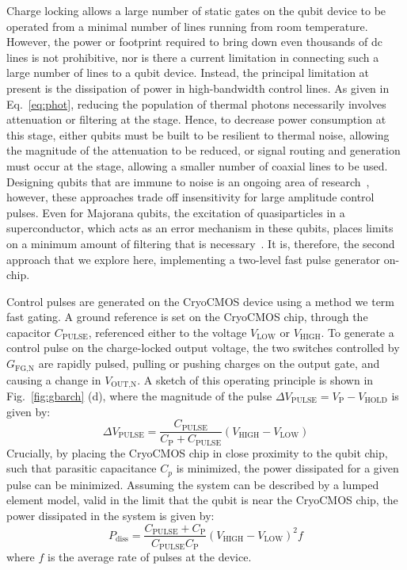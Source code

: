 Charge locking allows a large number of static gates on the qubit device to be operated from a minimal number of lines running from room temperature. However, the power or footprint required to bring down even thousands of dc lines is not prohibitive, nor is there a current limitation in connecting such a large number of lines to a qubit device. Instead, the principal limitation at present is the dissipation of power in high-bandwidth control lines. As given in Eq.~\ref{eq:phot}, reducing the population of thermal photons necessarily involves attenuation or filtering at the \si{\mk} stage. Hence, to decrease power consumption at this stage, either qubits must be built to be resilient to thermal noise, allowing
the magnitude of the attenuation to be reduced, or signal routing and generation must occur at the \si{\mk} stage, allowing a smaller number of coaxial lines to be used. Designing qubits
that are immune to noise is an ongoing area of research~\cite{PhysRevB.93.121410,PhysRevLett.121.177701,PhysRevB.97.155402}, however, these approaches trade off insensitivity for large amplitude control pulses. Even for Majorana qubits, the excitation of quasiparticles in a superconductor, which acts as an error mechanism in these qubits, places limits on a minimum amount of filtering that is necessary~\cite{PhysRevLett.106.167004}. It is, therefore, the second approach that we explore here, implementing a two-level
fast pulse generator on-chip.

Control pulses are generated on the CryoCMOS device using a method we term fast gating. A ground reference is set on the CryoCMOS chip, through the capacitor $C_\textrm{PULSE}$, referenced
either to the voltage $V_\textrm{LOW}$ or $V_\textrm{HIGH}$. To generate a control pulse on the charge-locked output voltage, the two switches controlled by $G_\textrm{FG,N}$ are rapidly pulsed,
pulling or pushing charges on the output gate, and causing a change in $V_\textrm{OUT,N}$. A sketch of this operating principle is shown in Fig.~\ref{fig:gbarch} (d), where the magnitude of the pulse $\Delta V_\textrm{PULSE} = V_\textrm{P} - V_\textrm{HOLD}$ is given by:
\begin{equation}
  \Delta V_\textrm{PULSE} = \frac{C_\textrm{PULSE}}{C_\textrm{P} + C_\textrm{PULSE}} (V_\textrm{HIGH} - V_\textrm{LOW})
\end{equation}
Crucially, by placing the CryoCMOS chip in close proximity to the qubit chip, such that parasitic capacitance $C_p$ is minimized, the power dissipated for a given pulse can be minimized.
Assuming the system can be described by a lumped element model, valid in the limit that the qubit is near the CryoCMOS chip, the power dissipated in the system is given by:
\begin{equation}
  P_\textrm{diss} = \frac{C_\textrm{PULSE} + C_\textrm{P}}{C_\textrm{PULSE}C_\textrm{P}} \left(V_\textrm{HIGH} - V_\textrm{LOW}\right)^2 f
  \label{eq:diss}
\end{equation}
where $f$ is the average rate of pulses at the device.


